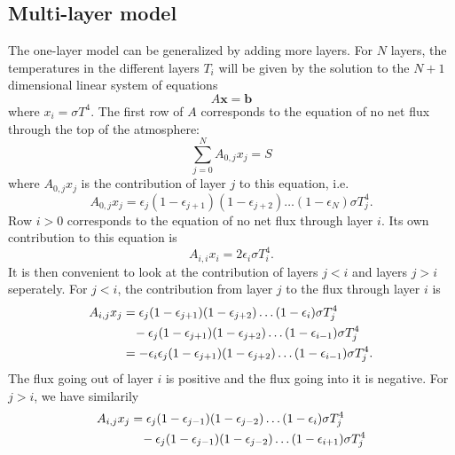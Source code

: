 \documentclass[twocolumn]{article}
\begin{document}
\begin{large}
\subsection*{Multi-layer model}
The one-layer model can be generalized by adding more layers. For $N$ layers, the temperatures in the different layers $T_i$ will be given by the solution to the $N+1$ dimensional linear system of equations
\begin{equation}
    A\mathbf{x} = \mathbf{b}
\end{equation}
where $x_i = \sigma T^4$. The first row of $A$ corresponds to the equation of no net flux through the top of the atmosphere:
\begin{equation}
    \sum_{j=0}^{N}A_{0,j}x_j = S
\end{equation}
where $A_{0,j}x_j$ is the contribution of layer $j$ to this equation, i.e.
\begin{equation}
    A_{0,j}x_j = \epsilon_j(1-\epsilon_{j+1})(1-\epsilon_{j+2})\dots(1-\epsilon_{N})\sigma T_j^4.
\end{equation}
Row $i>0$ corresponds to the equation of no net flux through layer $i$. Its own contribution to this equation is
\begin{equation}
    A_{i,i}x_i = 2\epsilon_i\sigma T_i^4.
\end{equation}
It is then convenient to look at the contribution of layers $j<i$ and layers $j>i$ seperately. For $j<i$, the contribution from layer $j$ to the flux through layer $i$ is 
\begin{equation}
    \begin{split}
        A_{i,j}x_j &= \epsilon_j(1-\epsilon_{j+1})(1-\epsilon_{j+2})\dots(1-\epsilon_{i})\sigma T_j^4 \\ 
        &\hspace{0.3cm} -\epsilon_j(1-\epsilon_{j+1})(1-\epsilon_{j+2})\dots(1-\epsilon_{i-1})\sigma T_j^4 \\ 
        &= -\epsilon_i\epsilon_j(1-\epsilon_{j+1})(1-\epsilon_{j+2})\dots(1-\epsilon_{i-1})\sigma T_j^4.
    \end{split}
\end{equation}
The flux going out of layer $i$ is positive and the flux going into it is negative. For $j>i$, we have similarily
\begin{equation}
    \begin{split}
        A_{i,j}x_j &= \epsilon_j(1-\epsilon_{j-1})(1-\epsilon_{j-2})\dots(1-\epsilon_{i})\sigma T_j^4 \\ 
        &\hspace{0.3cm} -\epsilon_j(1-\epsilon_{j-1})(1-\epsilon_{j-2})\dots(1-\epsilon_{i+1})\sigma T_j^4 \\ 

\end{split}
\end{equation}
\end{large}
\end{document}

